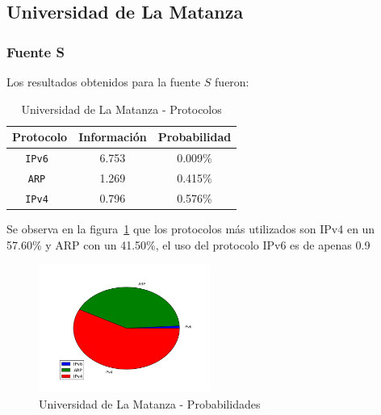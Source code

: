 \documentclass[final,inline,narroweqnarray,a4paper]{ieee}
\begin{document}
\subsection{Universidad de La Matanza}
\subsubsection{Fuente S}

Los resultados obtenidos para la fuente $S$ fueron:

\begin{table}[H]
    \begin{center}
        \begin{tabular}{|c|c|c|}
            \hline
            \textbf{Protocolo} & \textbf{Información} & \textbf{Probabilidad} \\ \hline
            \texttt{IPv6      }& 6.753        & 0.009\%     \\ \hline
            \texttt{ARP       }& 1.269        & 0.415\%     \\ \hline
	    \texttt{IPv4      }& 0.796        & 0.576\%     \\ \hline
        \end{tabular}
        \caption{Universidad de La Matanza - Protocolos}
        \label{table:universidadLMS}
    \end{center}
\end{table} 

Se observa en la figura~\ref{torta:universidadLMS} que los protocolos más utilizados son IPv4 en un 57.60\% y ARP con un 41.50\%, el uso del protocolo IPv6 es de apenas 0.9%

\begin{figure}[H]
    \begin{center}
        \includegraphics[width=0.5\textwidth]{plot/facultadS-pie.png}
        \caption{Universidad de La Matanza - Probabilidades}
        \label{torta:universidadLMS}
    \end{center}
\end{figure}
\end{document}
